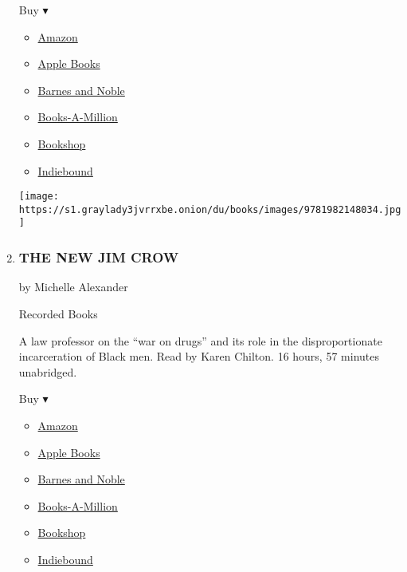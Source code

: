 \begin{enumerate}
  Buy ▾

  \begin{itemize}
  \tightlist
  \item
    \href{https://www.amazon.com/dp/1982148039?tag=NYTBSREV-20\&tag=NYTBS-20}{Amazon}
  \item
    \href{https://du-gae-books-dot-nyt-du-prd.appspot.com/buy?title=THE+ROOM+WHERE+IT+HAPPENED\&author=John+Bolton}{Apple
    Books}
  \item
    \href{https://www.anrdoezrs.net/click-7990613-11819508?url=https\%3A\%2F\%2Fwww.barnesandnoble.com\%2Fw\%2F\%3Fean\%3D9781797112404}{Barnes
    and Noble}
  \item
    \href{https://www.anrdoezrs.net/click-7990613-35140?url=https\%3A\%2F\%2Fwww.booksamillion.com\%2Fp\%2FTHE\%2BROOM\%2BWHERE\%2BIT\%2BHAPPENED\%2FJohn\%2BBolton\%2F9781797112404}{Books-A-Million}
  \item
    \href{https://bookshop.org/a/3546/9781797112404}{Bookshop}
  \item
    \href{https://www.indiebound.org/book/9781797112404?aff=NYT}{Indiebound}
  \end{itemize}

  \texttt{[image: https://s1.graylady3jvrrxbe.onion/du/books/images/9781982148034.jpg]}
\item
  \hypertarget{the-new-jim-crow}{%
  \subsubsection{THE NEW JIM CROW}\label{the-new-jim-crow}}

  by Michelle Alexander

  Recorded Books

  A law professor on the ``war on drugs'' and its role in the
  disproportionate incarceration of Black men. Read by Karen Chilton. 16
  hours, 57 minutes unabridged.

  Buy ▾

  \begin{itemize}
  \tightlist
  \item
    \href{http://www.amazon.com/The-New-Crow-Incarceration-Colorblindness/dp/1595586431?tag=NYTBS-20}{Amazon}
  \item
    \href{https://du-gae-books-dot-nyt-du-prd.appspot.com/buy?title=THE+NEW+JIM+CROW\&author=Michelle+Alexander}{Apple
    Books}
  \item
    \href{https://www.anrdoezrs.net/click-7990613-11819508?url=https\%3A\%2F\%2Fwww.barnesandnoble.com\%2Fw\%2F\%3Fean\%3D9781464048258}{Barnes
    and Noble}
  \item
    \href{https://www.anrdoezrs.net/click-7990613-35140?url=https\%3A\%2F\%2Fwww.booksamillion.com\%2Fp\%2FTHE\%2BNEW\%2BJIM\%2BCROW\%2FMichelle\%2BAlexander\%2F9781464048258}{Books-A-Million}
  \item
    \href{https://bookshop.org/a/3546/9781464048258}{Bookshop}
  \item
    \href{https://www.indiebound.org/book/9781464048258?aff=NYT}{Indiebound}
  \end{itemize}


\end{enumerate}
